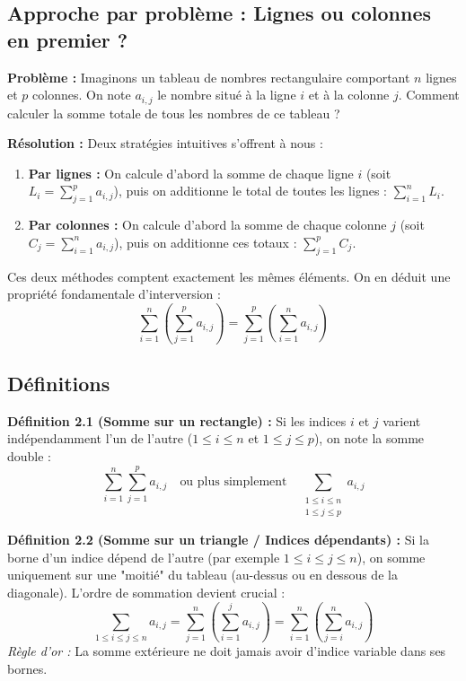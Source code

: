 \documentclass[12pt,a4paper]{report}
\begin{document}
\subsection{Approche par problème : Lignes ou colonnes en premier ?}
\textbf{Problème :} Imaginons un tableau de nombres rectangulaire comportant $n$ lignes et $p$ colonnes. On note $a_{i,j}$ le nombre situé à la ligne $i$ et à la colonne $j$. Comment calculer la somme totale de tous les nombres de ce tableau ?

\textbf{Résolution :} Deux stratégies intuitives s'offrent à nous :
\begin{enumerate}
    \item \textbf{Par lignes :} On calcule d'abord la somme de chaque ligne $i$ (soit $L_i = \sum_{j=1}^{p} a_{i,j}$), puis on additionne le total de toutes les lignes : $\sum_{i=1}^{n} L_i$.
    \item \textbf{Par colonnes :} On calcule d'abord la somme de chaque colonne $j$ (soit $C_j = \sum_{i=1}^{n} a_{i,j}$), puis on additionne ces totaux : $\sum_{j=1}^{p} C_j$.
\end{enumerate}
Ces deux méthodes comptent exactement les mêmes éléments. On en déduit une propriété fondamentale d'interversion :
\[ \sum_{i=1}^{n} \left( \sum_{j=1}^{p} a_{i,j} \right) = \sum_{j=1}^{p} \left( \sum_{i=1}^{n} a_{i,j} \right) \]

\subsection{Définitions}

\textbf{Définition 2.1 (Somme sur un rectangle) :} Si les indices $i$ et $j$ varient indépendamment l'un de l'autre ($1 \le i \le n$ et $1 \le j \le p$), on note la somme double :
\[ \sum_{i=1}^{n} \sum_{j=1}^{p} a_{i,j} \quad \text{ou plus simplement} \quad \sum_{\substack{1 \le i \le n \\ 1 \le j \le p}} a_{i,j} \]

\textbf{Définition 2.2 (Somme sur un triangle / Indices dépendants) :} Si la borne d'un indice dépend de l'autre (par exemple $1 \le i \le j \le n$), on somme uniquement sur une "moitié" du tableau (au-dessus ou en dessous de la diagonale). L'ordre de sommation devient crucial :
\[ \sum_{1 \le i \le j \le n} a_{i,j} = \sum_{j=1}^{n} \left( \sum_{i=1}^{j} a_{i,j} \right) = \sum_{i=1}^{n} \left( \sum_{j=i}^{n} a_{i,j} \right) \]
\textit{Règle d'or :} La somme extérieure ne doit jamais avoir d'indice variable dans ses bornes.
\end{document}
